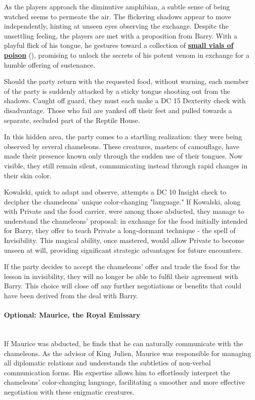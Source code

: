 As the players approach the diminutive amphibian, a subtle sense of being watched seems to permeate the air. The flickering shadows appear to move independently, hinting at unseen eyes observing the exchange. Despite the unsettling feeling, the players are met with a proposition from Barry. With a playful flick of his tongue, he gestures toward a collection of \hyperref[sec:VialOfPoison-DartFrogPoison]{\textbf{small vials of poison}} (), promising to unlock the secrets of his potent venom in exchange for a humble offering of sustenance.

Should the party return with the requested food, without warning, each member of the party is suddenly attacked by a sticky tongue shooting out from the shadows. Caught off guard, they must each make a DC 15 Dexterity check with disadvantage. Those who fail are yanked off their feet and pulled towards a separate, secluded part of the Reptile House.

In this hidden area, the party comes to a startling realization: they were being observed by several chameleons. These creatures, masters of camouflage, have made their presence known only through the sudden use of their tongues. Now visible, they still remain silent, communicating instead through rapid changes in their skin color.

Kowalski, quick to adapt and observe, attempts a DC 10 Insight check to decipher the chameleons' unique color-changing "language." If Kowalski, along with Private and the food carrier, were among those abducted, they manage to understand the chameleons' proposal: in exchange for the food initially intended for Barry, they offer to teach Private a long-dormant technique - the spell of Invisibility. This magical ability, once mastered, would allow Private to become unseen at will, providing significant strategic advantages for future encounters.

If the party decides to accept the chameleons' offer and trade the food for the lesson in invisibility, they will no longer be able to fulfil their agreement with Barry. This choice will close off any further negotiations or benefits that could have been derived from the deal with Barry.\\

\paragraph*{Optional: Maurice, the Royal Emissary}\hfill\\
If Maurice was abducted, he finds that he can naturally communicate with the chameleons. As the advisor of King Julien, Maurice was responsible for managing all diplomatic relations and understands the subtleties of non-verbal communication forms. His expertise allows him to effortlessly interpret the chameleons' color-changing language, facilitating a smoother and more effective negotiation with these enigmatic creatures.

